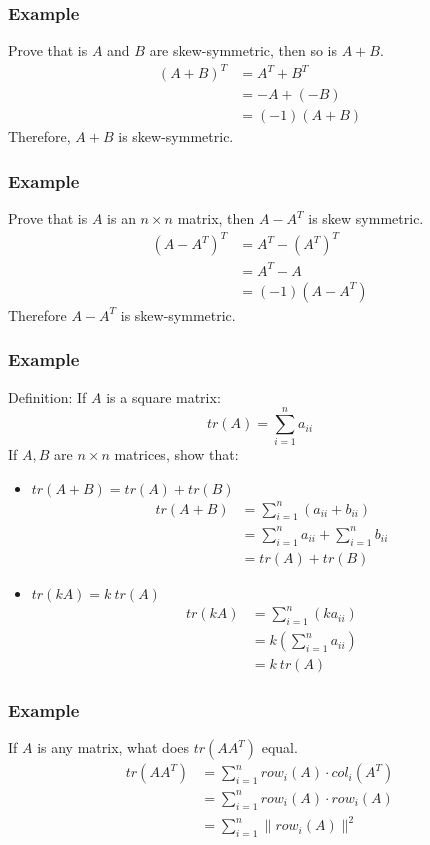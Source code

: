 \documentclass[letterpaper, 12pt]{math}
\begin{document}
\subsubsection*{Example}
Prove that is \( A \) and \( B \) are skew-symmetric, then so is \( A+B \).
\begin{align*}
  (A+B)^T &= A^T+B^T \\
  &= -A+(-B) \\
  &= (-1)(A+B)
\end{align*}
Therefore, \( A+B \) is skew-symmetric.

\subsubsection*{Example}
Prove that is \( A \) is an \( n\times n \) matrix, then \( A-A^T \) is skew
symmetric.
\begin{align*}
  (A-A^T)^T &= A^T-(A^T)^T \\
  &= A^T-A \\
  &= (-1)(A-A^T)
\end{align*}
Therefore \( A-A^T \) is skew-symmetric.

\subsubsection*{Example}
Definition: If \( A \) is a square matrix:
\[ tr(A) = \sum_{i=1}^{n}a_{ii} \]
If \( A,B \) are \( n\times n \) matrices, show that:
\begin{itemize}
  \item \( tr(A+B) = tr(A)+tr(B) \)
  \begin{align*}
    tr(A+B) &= \sum_{i=1}^{n}(a_{ii}+b_{ii}) \\
    &= \sum_{i=1}^{n}a_{ii}+\sum_{i=1}^{n}b_{ii} \\
    &= tr(A)+tr(B)
  \end{align*}
  \item \( tr(kA) = k~tr(A) \)
  \begin{align*}
    tr(kA) &= \sum_{i=1}^{n}(ka_{ii}) \\
    &= k\left(\sum_{i=1}^{n}a_{ii}\right) \\
    &= k~tr(A)
  \end{align*}
\end{itemize}

\subsubsection*{Example}
If \( A \) is any matrix, what does \( tr(AA^T) \) equal.
\begin{align*}
  tr(AA^T) &= \sum_{i=1}^{n}row_i(A)\cdot col_i(A^T) \\
  &= \sum_{i=1}^{n}row_i(A)\cdot row_i(A) \\
  &= \sum_{i=1}^{n}\|row_i(A)\|^2
\end{align*}
\end{document}
